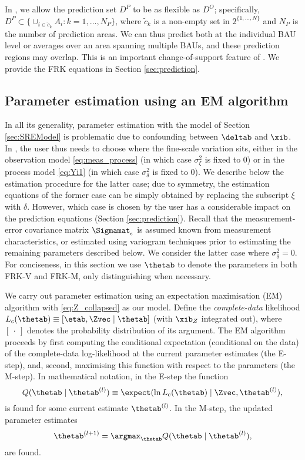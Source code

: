 In , we allow the prediction set $D^P$ to be as flexible as $D^O$; specifically, $D^P \subset \{ \cup_{i \in \tilde{c}_k} A_i : k = 1,\dots,N_P \}$, where $\tilde{c}_k$ is a non-empty set in $2^{\{1,\dots,N\}}$ and $N_P$ is the number of prediction areas. We can thus predict both at the individual BAU level or averages over an area spanning multiple BAUs, and these prediction regions may overlap. This is an important change-of-support feature of . We provide the FRK equations in Section \ref{sec:prediction}.

\subsection{Parameter estimation using an EM algorithm} \label{sec:estimation}

In all its generality, parameter estimation with the model of Section \ref{sec:SREModel} is problematic due to confounding between $\deltab$ and $\xib$. In , the user thus needs to choose where the fine-scale variation sits, either in the observation model \eqref{eq:meas_process} (in which case $\sigma^2_\xi$ is fixed to 0) or in the process model \eqref{eq:Yi1} (in which case $\sigma^2_\delta$ is fixed to 0). We describe below the estimation procedure for the latter case; due to symmetry, the estimation equations of the former case can be simply obtained by replacing the subscript $\xi$ with $\delta$. However, which case is chosen by the user has a considerable impact on the prediction equations (Section \ref{sec:prediction}). Recall that the measurement-error covariance matrix $\Sigmamat_\epsilon$ is assumed known from measurement characteristics, or estimated using variogram techniques prior to estimating the remaining parameters described below. We consider the latter case where $\sigma^2_\delta = 0$. For conciseness, in this section we use $\thetab$ to denote the parameters in both FRK-V and FRK-M, only distinguishing when necessary.

We carry out parameter estimation using an expectation maximisation (EM) algorithm \citep[similar to][]{Katzfuss_2011,Nguyen_2014} with \eqref{eq:Z_collapsed} as our model. Define the \emph{complete-data} likelihood $L_c(\thetab) \equiv [\etab,\Zvec \mid \thetab]$ (with $\xib_Z$ integrated out), where $[~\cdot~]$ denotes the probability distribution of its argument.  The EM algorithm proceeds by first computing the conditional expectation (conditional on the data) of the complete-data log-likelihood at the current parameter estimates (the E-step), and, second, maximising this function with respect to the parameters (the M-step). In mathematical notation, in the E-step the function
\begin{equation*}
Q(\thetab \mid \thetab^{(l)}) \equiv \expect(\ln L_c(\thetab) \mid \Zvec,\thetab^{(l)}),
\end{equation*}
is found for some current estimate $\thetab^{(l)}$. In the M-step, the updated parameter estimates
\begin{equation*}
\thetab^{(l+1)} = \argmax_\thetab Q(\thetab \mid \thetab^{(l)}),
\end{equation*}
are found.

